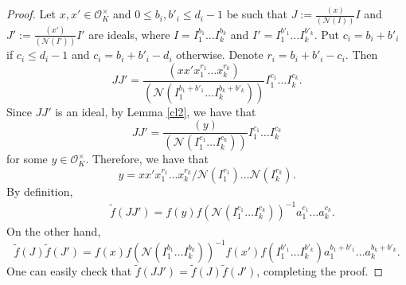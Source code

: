 \documentclass[11pt]{amsart}
\theoremstyle{definition}
\newcommand{\N}{{\mathbb N}}
\newcommand{\NN}{{\mathcal N}}
\begin{document}
\begin{proof}
Let $x,x'\in \mathcal{O}_K^{\times}$ and $0\leq b_{i},b'_{i}\leq d_{i}-1$ be such that $J:=\frac{(x)}{(\NN(I))}I$ and $J':=\frac{(x')}{(\NN(I'))}I'$ are ideals, where $I=I_{1}^{b_{1}}\dots I_{k}^{b_{k}}$ and $I'=I_{1}^{b'_{1}}\dots I_{k}^{b'_{k}}$.
Put $c_{i}=b_{i}+b'_{i}$ if $c_{i}\leq d_{i}-1$ and $c_{i}=b_{i}+b'_{i}-d_i$ otherwise. Denote $r_{i}=b_{i}+b'_{i}-c_{i}$.
Then 
$$JJ'=\frac{(xx'x_{1}^{r_{1}}\dots x_{k}^{r_{k}})}{(\NN(I_{1}^{b_{1}+b'_{1}}\dots I_{k}^{b_{k}+b'_{k}}))}I_{1}^{c_{1}}\dots I_{k}^{c_{k}}.$$
Since $JJ'$ is an ideal, by  Lemma \ref{cl2}, we have that 
$$JJ'=\frac{(y)}{(\NN(I_{1}^{c_{1}}\dots I_{k}^{c_{k}}))}I_{1}^{c_{1}}\dots I_{k}^{c_{k}}$$
for some $y\in\mathcal{O}_K^{\times}$.
Therefore, we have that 
$$y=xx'x_{1}^{r_{1}}\dots x_{k}^{r_{k}}/\NN(I_{1}^{r_{1}})\dots \NN(I_{k}^{r_{k}}).$$
By definition,
\begin{equation*}
    \begin{split}
        &\qquad \tilde{f}(JJ')
        =f(y)f(\NN(I_{1}^{c_{1}}\dots I_{k}^{c_{k}}))^{-1}a_{1}^{c_{1}}\dots a_{k}^{c_{k}}.
    \end{split}
\end{equation*}
On the other hand,
$$\tilde{f}(J)\tilde{f}(J')=f(x)f(\NN(I_{1}^{b_{1}}\dots I_{k}^{b_{k}}))^{-1}f(x')f(I_{1}^{b'_{1}}\dots I_{k}^{b'_{k}})a_{1}^{b_{1}+b'_{1}}\dots a_{k}^{b_{k}+b'_{k}}.$$
One can easily check that $\tilde{f}(JJ')=\tilde{f}(J)\tilde{f}(J')$, completing the proof.
%

\end{proof}
\end{document}
